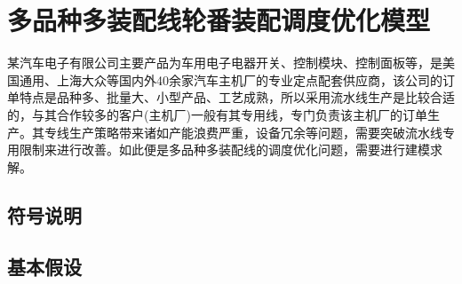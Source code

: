 \chapter{多品种多装配线轮番装配调度优化模型}
某汽车电子有限公司主要产品为车用电子电器开关、控制模块、控制面板等，是美国通用、上海大众等国内外40余家汽车主机厂的专业定点配套供应商，该公司的订单特点是品种多、批量大、小型产品、工艺成熟，所以采用流水线生产是比较合适的，与其合作较多的客户(主机厂)一般有其专用线，专门负责该主机厂的订单生产。其专线生产策略带来诸如产能浪费严重，设备冗余等问题，需要突破流水线专用限制来进行改善。如此便是多品种多装配线的调度优化问题，需要进行建模求解。
\section{符号说明}

\section{基本假设}

